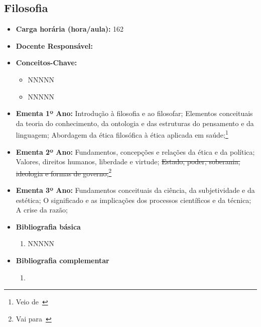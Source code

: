 \documentclass[11pt,fleqn]{book} %
\newcommand{\VER}[1]{\begingroup\color{red}#1\endgroup}
\begin{document}
\subsection{Filosofia}\label{disc:filosofia}
\begin{itemize}
	\item \textbf{Carga horária (hora/aula):} 162
	\item \textbf{Docente Responsável:}
	\item \textbf{Conceitos-Chave:}
	\begin{itemize}
		\item NNNNN
		\item NNNNN
	\end{itemize}
	\item \textbf{Ementa 1º Ano:} 
	Introdução à filosofia e ao filosofar;
	Elementos conceituais da teoria do conhecimento, da ontologia e das estruturas do pensamento e da linguagem;
	\VER{Abordagem da ética filosófica à ética aplicada em saúde;}\footnote{Veio de~} 
	\item \textbf{Ementa 2º Ano:} 	
	Fundamentos, concepções e relações da ética e da política; 
	Valores, direitos humanos, liberdade e virtude;
	\sout{Estado, poder, soberania, ideologia e formas de governo;}\footnote{Vai para~}
	\item \textbf{Ementa 3º Ano:} 
	Fundamentos conceituais da ciência, da subjetividade e da estética;
	O significado e as implicações dos processos científicos e da técnica; 
	A crise da razão;
	\item \textbf{Bibliografia básica}
	\begin{enumerate}
		\item NNNNN
	\end{enumerate}
	\item \textbf{Bibliografia complementar}
	\begin{enumerate}
		\item 
	\end{enumerate}	
\end{itemize}

\newpage
\end{document}
